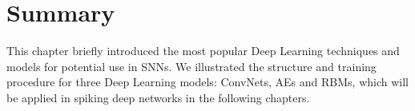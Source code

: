 
\section{Summary}
This chapter briefly introduced the most popular Deep Learning techniques and models for potential use in SNNs.
We illustrated the structure and training procedure for three Deep Learning models: ConvNets, AEs and RBMs, which will be applied in spiking deep networks in the following chapters.